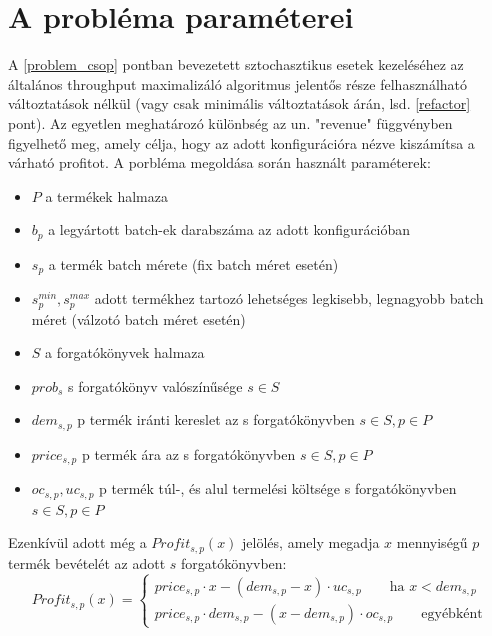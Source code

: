 \section{A probléma paraméterei} \label{problem_parameters}
A \ref{problem_csop} pontban bevezetett sztochasztikus esetek kezeléséhez az általános throughput maximalizáló algoritmus jelentős része felhasználható változtatások nélkül (vagy csak minimális változtatások árán, lsd. \ref{refactor} pont). Az egyetlen meghatározó különbség az un. "revenue" függvényben figyelhető meg, amely célja, hogy az adott konfigurációra nézve kiszámítsa a várható profitot. A porbléma megoldása során használt paraméterek:
\begin {itemize}
\item[] $P$ a termékek halmaza
\item[] $b_p$ a legyártott batch-ek darabszáma az adott konfigurációban
\item[] $s_p$ a termék batch mérete (fix batch méret esetén)
\item[] $s_p^{min},s_p^{max}$ adott termékhez tartozó lehetséges legkisebb, legnagyobb batch méret (válzotó batch méret esetén)
\item[] $S$ a forgatókönyvek halmaza
\item[] $prob_s$ s forgatókönyv valószínűsége $s	\in S$
\item[] $dem_{s,p}$ p termék iránti kereslet az s forgatókönyvben $s	\in S, p	\in P$
\item[] $price_{s,p}$ p termék ára az s forgatókönyvben $s	\in S, p	\in P$
\item[] $oc_{s,p}, uc_{s,p}$ p termék túl-, és alul termelési költsége s forgatókönyvben $s	\in S, p	\in P$
\end {itemize}
Ezenkívül adott még a $Profit_{s,p}(x)$ jelölés, amely megadja $x$ mennyiségű $p$ termék bevételét az adott $s$ forgatókönyvben:
\begin{equation*}
Profit_{s,p}(x)= \begin{cases}
            price_{s,p}\cdot x-(dem_{s,p}-x) \cdot uc_{s,p}\qquad \text{ha } x<dem_{s,p} \\
            price_{s,p} \cdot dem_{s,p}-(x-dem_{s,p}) \cdot oc_{s,p}\qquad \text{egyébként}
       \end{cases}
\end{equation*}\\
